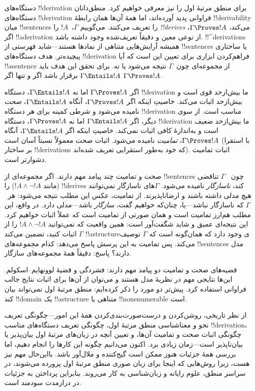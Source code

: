 \documentclass[../../../include/open-logic-section]{subfiles}
\begin{document}


دستگاه‌های !!{derivation} برای منطق مرتبهٔ اول را نیز معرفی خواهیم کرد.
منطق‌دانان دستگاه‌های !!{derivation} فراوانی پدید آورده‌اند، اما همهٔ
آن‌ها همان رابطهٔ !!{derivability} میان !!{sentence}s را تعریف می‌کنند.
می‌گوییم $\Gamma$،~$!A$ را \emph{!!{derive}s} می‌کند،
$\Gamma \Proves !A$، اگر !!a{derivation} از نوعی معین و دقیقاً
تعریف‌شده وجود داشته باشد. !!^{derivation}s همیشه آرایش‌هایی متناهی از
نمادها هستند---شاید فهرستی از !!{sentence}s یا ساختاری پیچیده‌تر. هدف
دستگاه‌های !!{derivation} فراهم‌کردن ابزاری برای تعیین این است که آیا
!!a{sentence} از مجموعه‌ای چون~$\Gamma$ نتیجه می‌شود یا نه. برای تحقق
این هدف باید $\Gamma \Entails !A$ برقرار باشد اگر و تنها اگر
$\Gamma \Proves !A$.

اگر $\Gamma \Proves !A$ اما نه $\Gamma \Entails !A$، دستگاه
!!{derivation} ما بیش‌ازحد قوی است و بیش‌ازحد اثبات می‌کند. خاصیتِ اینکه
اگر $\Gamma \Proves !A$، آنگاه $\Gamma \Entails !A$، \emph{صحت}
نامیده می‌شود و شرطی کمینه برای هر دستگاه !!{derivation} مناسب است.
از سوی دیگر، اگر $\Gamma \Entails !A$ اما نه $\Gamma \Proves !A$،
دستگاه !!{derivation} ما بیش‌ازحد ضعیف است و به‌اندازهٔ کافی اثبات
نمی‌کند. خاصیتِ اینکه اگر $\Gamma \Entails !A$، آنگاه
$\Gamma \Proves !A$، \emph{تمامیت} نامیده می‌شود. اثبات صحت معمولاً
نسبتاً آسان است (با استقرا بر ساختار !!{derivation}s که خود به‌طور
استقرایی تعریف شده‌اند). اثبات تمامیت دشوارتر است.

صحت و تمامیت چند پیامد مهم دارند. اگر مجموعه‌ای از !!{sentence}s چون
~$\Gamma$ تناقضی (مانند $!A \land \lnot !A$) را !!{derive}s کند،
\emph{ناسازگار} نامیده می‌شود. $\Gamma$های ناسازگار نمی‌توانند هیچ
مدلی داشته باشند و ارضاناپذیرند. از تمامیت، عکس این مطلب نتیجه می‌شود:
هر~$\Gamma$ که ناسازگار نباشد---یا، چنان‌که خواهیم گفت، \emph{سازگار}
باشد---مدلی دارد. در واقع، این مطلب هم‌ارز تمامیت است و همان صورتی از
تمامیت است که عملاً اثبات خواهیم کرد. این نتیجه‌ای عمیق و شاید
شگفت‌آور است: همین واقعیت که نمی‌توانید $!A \land \lnot !A$ را از
$\Gamma$ اثبات کنید، تضمین می‌کند !!a{structure}ی وجود دارد که همان‌گونه
است که $\Gamma$ توصیف می‌کند. پس تمامیت به این پرسش پاسخ می‌دهد: کدام
مجموعه‌های !!{sentence}s مدل دارند؟ پاسخ: دقیقاً همهٔ مجموعه‌های سازگار.

قضیه‌های صحت و تمامیت دو پیامد مهم دارند: فشردگی و قضیهٔ
لوونهایم--اسکولم. این‌ها نتایجی مهم در نظریهٔ مدل هستند و می‌توان از
آن‌ها برای اثبات نتایج جالب فراوانی استفاده کرد. پیش‌تر دو مورد را ذکر
کرده‌ایم: منطق مرتبهٔ اول نمی‌تواند بیان کند !!{domain} یک
!!a{structure} متناهی یا !!{nonenumerable} است.

از نظر تاریخی، روشن‌کردن و درست‌صورت‌بندی‌کردن همهٔ این امور---چگونگی
تعریف نحو و معناشناسی منطق مرتبهٔ اول، چگونگی تعریف دستگاه‌های مناسب
!!{derivation}، چگونگی اثبات صحت و تمامیت آن‌ها، و تعیین آنچه در
زبان‌های مرتبهٔ اول بیان‌پذیر یا بیان‌ناپذیر است---زمان زیادی برد. اکنون
می‌دانیم چگونه این کارها را انجام دهیم، اما بررسی همهٔ جزئیات هنوز ممکن
است گیج‌کننده و ملال‌آور باشد. بااین‌حال مهم نیز هست، زیرا روش‌هایی که
اینجا برای زبان صوری منطق مرتبهٔ اول پرورده می‌شوند، در سراسر منطق،
علوم رایانه و زبان‌شناسی به کار می‌روند. بنابراین پرداختن به جزئیات در
درازمدت سودمند است.
\end{document}
